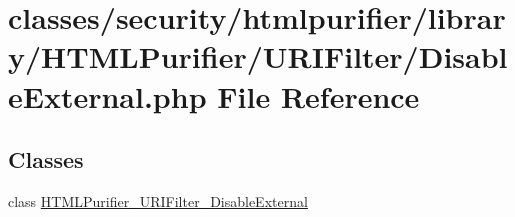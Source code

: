 \hypertarget{DisableExternal_8php}{\section{classes/security/htmlpurifier/library/\+H\+T\+M\+L\+Purifier/\+U\+R\+I\+Filter/\+Disable\+External.php File Reference}
\label{DisableExternal_8php}
}
\subsection*{Classes}
\begin{DoxyCompactItemize}
\item 
class \hyperlink{classHTMLPurifier__URIFilter__DisableExternal}{H\+T\+M\+L\+Purifier\+\_\+\+U\+R\+I\+Filter\+\_\+\+Disable\+External}
\end{DoxyCompactItemize}
